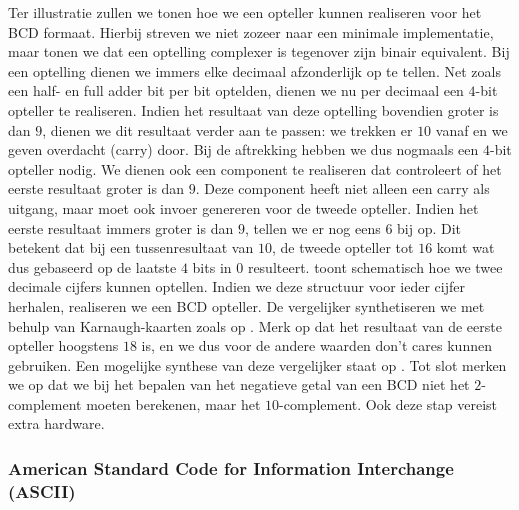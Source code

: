 Ter illustratie zullen we tonen hoe we een opteller kunnen realiseren voor het BCD formaat. Hierbij streven we niet zozeer naar een minimale implementatie, maar tonen we dat een optelling complexer is tegenover zijn binair equivalent. Bij een optelling dienen we immers elke decimaal afzonderlijk op te tellen. Net zoals een half- en full adder bit per bit optelden, dienen we nu per decimaal een $4$-bit opteller te realiseren. Indien het resultaat van deze optelling bovendien groter is dan $9$, dienen we dit resultaat verder aan te passen: we trekken er $10$ vanaf en we geven overdacht (carry) door. Bij de aftrekking hebben we dus nogmaals een $4$-bit opteller nodig. We dienen ook een component te realiseren dat controleert of het eerste resultaat groter is dan $9$. Deze component heeft niet alleen een carry als uitgang, maar moet ook invoer genereren voor de tweede opteller. Indien het eerste resultaat immers groter is dan $9$, tellen we er nog eens 6 bij op. Dit betekent dat bij een tussenresultaat van $10$, de tweede opteller tot $16$ komt wat dus gebaseerd op de laatste $4$ bits in $0$ resulteert.  toont schematisch hoe we twee decimale cijfers kunnen optellen. Indien we deze structuur voor ieder cijfer herhalen, realiseren we een BCD opteller. De vergelijker synthetiseren we met behulp van Karnaugh-kaarten zoals op . Merk op dat het resultaat van de eerste opteller hoogstens $18$ is, en we dus voor de andere waarden don't cares kunnen gebruiken. Een mogelijke synthese van deze vergelijker staat op . Tot slot merken we op dat we bij het bepalen van het negatieve getal van een BCD niet het $2$-complement moeten berekenen, maar het $10$-complement. Ook deze stap vereist extra hardware.

\subsubsection{American Standard Code for Information Interchange (ASCII)}

